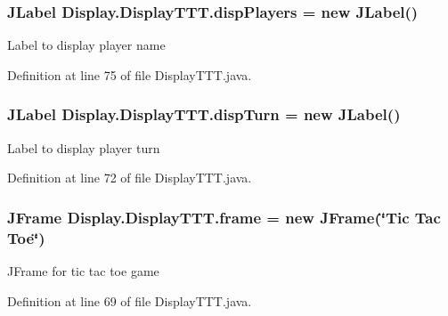 \subsubsection[{disp\+Players}]{\setlength{\rightskip}{0pt plus 5cm}J\+Label Display.\+Display\+T\+T\+T.\+disp\+Players = new J\+Label()\hspace{0.3cm}{\ttfamily [private]}}\label{class_display_1_1_display_t_t_t_a2f2eeba39f4aa0dcc00ef6b72e2b6c66}
Label to display player name 

Definition at line 75 of file Display\+T\+T\+T.\+java.

\hypertarget{class_display_1_1_display_t_t_t_a22f3ef7e7b2123a2b900bc8511bdd474}{}
\subsubsection[{disp\+Turn}]{\setlength{\rightskip}{0pt plus 5cm}J\+Label Display.\+Display\+T\+T\+T.\+disp\+Turn = new J\+Label()\hspace{0.3cm}{\ttfamily [private]}}\label{class_display_1_1_display_t_t_t_a22f3ef7e7b2123a2b900bc8511bdd474}
Label to display player turn 

Definition at line 72 of file Display\+T\+T\+T.\+java.

\hypertarget{class_display_1_1_display_t_t_t_ab4d0cb92c4459675e8abd22f8ad4161f}{}
\subsubsection[{frame}]{\setlength{\rightskip}{0pt plus 5cm}J\+Frame Display.\+Display\+T\+T\+T.\+frame = new J\+Frame(\char`\"{}Tic Tac Toe\char`\"{})\hspace{0.3cm}{\ttfamily [private]}}\label{class_display_1_1_display_t_t_t_ab4d0cb92c4459675e8abd22f8ad4161f}
J\+Frame for tic tac toe game 

Definition at line 69 of file Display\+T\+T\+T.\+java.

\hypertarget{class_display_1_1_display_t_t_t_a2e4a57cf17355b6a63f5b9d4e9e74de4}{}
